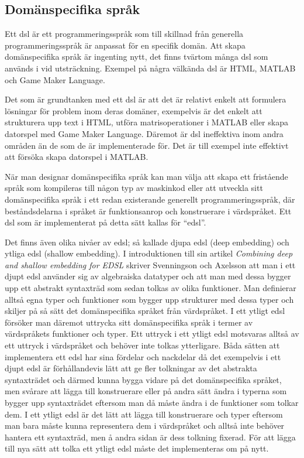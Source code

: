 \documentclass[12pt,a4paper,twoside,openright]{article}
\begin{document}
\subsection{Domänspecifika språk}
Ett \gls{dsl} är ett programmeringsspråk som till skillnad från
generella programmeringsspråk är anpassat för en specifik domän. Att
skapa domän\-specifika språk är ingenting nytt, det finns tvärtom
många \gls{dsl} som används i vid utsträckning. Exempel på några
välkända \gls{dsl} är HTML, MATLAB och Game Maker Language.

Det som är grundtanken med ett \gls{dsl} är att det är relativt enkelt
att formulera lösningar för problem inom deras domäner, exempelvis är
det enkelt att strukturera upp text i HTML, utföra matrisoperationer i
MATLAB eller skapa datorspel med Game Maker Language. Däremot är
\gls{dsl} ineffektiva inom andra områden än de som de är
implementerade för. Det är till exempel inte effektivt att försöka
skapa datorspel i MATLAB.

När man designar domänspecifika språk kan man välja att skapa ett
fristående språk som kompileras till någon typ av maskinkod eller att
utveckla sitt domänspecifika språk i ett redan existerande generellt
programmeringsspråk, där beståndsdelarna i språket är funktionsanrop
och konstruerare i värdspråket. Ett \gls{dsl} som är implementerat på
detta sätt kallas för ``\gls{edsl}''.

Det finns även olika nivåer av \gls{edsl}; så kallade djupa \gls{edsl}
(deep embedding) och ytliga \gls{edsl} (shallow embedding). I
introduktionen till sin artikel \textit{Combining deep and shallow
  embedding for EDSL} skriver Svenningson och Axelsson
\cite{Svenningsson2012combining} att man i ett djupt \gls{edsl}
använder sig av algebraiska datatyper och att man med dessa bygger upp
ett abstrakt syntaxträd som sedan tolkas av olika funktioner. Man
definierar alltså egna typer och funktioner som bygger upp strukturer
med dessa typer och skiljer på så sätt det domänspecifika språket från
värdspråket. I ett ytligt \gls{edsl} försöker man däremot uttrycka
sitt domänspecifika språk i termer av värdspråkets funktioner och
typer. Ett uttryck i ett ytligt \gls{edsl} motsvaras alltså av ett
uttryck i värdspråket och behöver inte tolkas ytterligare. Båda sätten
att implementera ett \gls{edsl} har sina fördelar och nackdelar då det
exempelvis i ett djupt \gls{edsl} är förhållandevis lätt att ge fler
tolkningar av det abstrakta syntaxträdet och därmed kunna bygga vidare
på det domänspecifika språket, men svårare att lägga till konstruerare
eller på andra sätt ändra i typerna som bygger upp syntaxträdet
eftersom man då måste ändra i de funktioner som tolkar dem. I ett
ytligt \gls{edsl} är det lätt att lägga till konstruerare och typer
eftersom man bara måste kunna representera dem i värdspråket och
alltså inte behöver hantera ett syntaxträd, men å andra sidan är dess
tolkning fixerad. För att lägga till nya sätt att tolka ett ytligt
\gls{edsl} måste det implementeras om på nytt.
\end{document}
